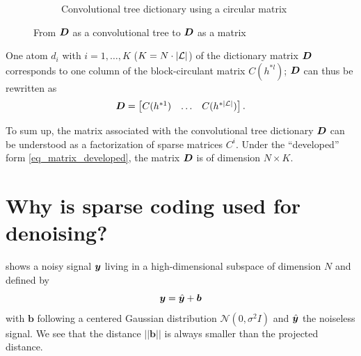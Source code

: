 \begin{figure}[!ht]
\begin{subfigure}[b]{0.69\textwidth}
\caption{Convolutional tree dictionary using a circular matrix}
\end{subfigure}
\caption{From $\bm{D}$ as a convolutional tree to $\bm{D}$ as a matrix}\label{fig_tree_as_matrix}
\end{figure}

One atom $d_i$ with $i = 1,\dots,K$ ($K=N \cdot |\mathcal L|$) of the dictionary matrix $\bm{D}$ corresponds to one column of the block-circulant matrix $C(h^{*l})$; $\bm{D}$ can thus be rewritten as
\begin{align}\bm{D} = \begin{bmatrix} C(h^{*1}) & \dots & C(h^{*{|\mathcal L|}}) \end{bmatrix}.\label{eq_matrix_factorized} \end{align}

To sum up, the matrix associated with the convolutional tree dictionary $\bm{D}$ can be understood as a factorization of sparse matrices $C^i$. Under the “developed” form \eqref{eq_matrix_developed}, the matrix $\bm{D}$ is of dimension $N \times K$.




\FloatBarrier
\section{Why is sparse coding used for denoising?}

 shows a noisy signal $\bm{y}$ living in a high-dimensional subspace of dimension $N$ and defined by
\begin{equation*}\bm{y}=\hat{\bm{y}} + \bm{b}\end{equation*}
with $\bm{b}$ following a centered Gaussian distribution $\mathcal{N}(0,\sigma^2I)$ and $\hat{\bm{y}}$ the noiseless signal. We see that the distance $||\bm{b}||$ is always smaller than the projected distance.

